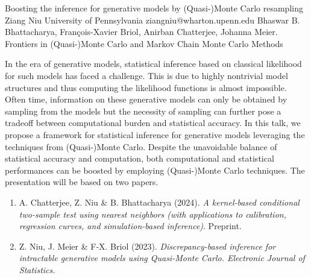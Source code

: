 \begin{talk}
  {Boosting the inference for generative models by (Quasi-)Monte Carlo resampling}%
  {Ziang Niu}%
  {University of Pennsylvania}%
  {ziangniu@wharton.upenn.edu}%
  {Bhaswar B. Bhattacharya, Fran\c{c}ois-Xavier Briol, Anirban Chatterjee, Johanna Meier.}%
  {Frontiers in (Quasi-)Monte Carlo and Markov Chain Monte Carlo Methods}%
    
   
In the era of generative models, statistical inference based on classical likelihood for such models has faced a challenge. This is due to highly nontrivial model structures and thus computing the likelihood functions is almost impossible. Often time, information on these generative models can only be obtained by sampling from the models but the necessity of sampling can further pose a tradeoff between computational burden and statistical accuracy. In this talk, we propose a framework for statistical inference for generative models leveraging the techniques from (Quasi-)Monte Carlo. Despite the unavoidable balance of statistical accuracy and computation, both computational and statistical performances can be boosted by employing (Quasi-)Monte Carlo techniques. The presentation will be based on two papers.

\begin{enumerate}
 \item[{[1]}] A. Chatterjee, Z. Niu \& B. Bhattacharya (2024). {\it A kernel-based conditional two-sample test using nearest neighbors (with applications to calibration, regression curves, and simulation-based inference)}. Preprint.
 \item[{[2]}] Z. Niu, J. Meier \& F-X. Briol (2023). \it{Discrepancy-based inference for
  intractable generative models using
  Quasi-Monte Carlo.} Electronic Journal of Statistics.
\end{enumerate}

\medskip

\end{talk}

